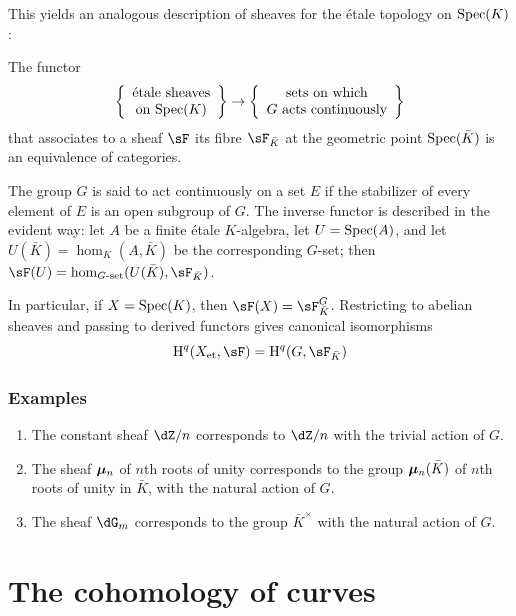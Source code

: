This yields an analogous description of sheaves for the étale topology on
$\operatorname{Spec}(K)$:

\begin{proposition}\label{I:2-4-4}
The functor
\[
  \left\{\begin{array}{c}
          \textnormal{étale sheaves} \\
          \textnormal{on $\operatorname{Spec}(K)$}
        \end{array}\right\}
  \to
  \left\{\begin{array}{c}
          \textnormal{sets on which} \\
          \textnormal{$G$ acts continuously}
        \end{array}\right\}
\]
that associates to a sheaf $\sF$ its fibre $\sF_{\bar K}$ at the
geometric point $\operatorname{Spec}(\bar K)$ is an equivalence of categories.
\end{proposition}

The group $G$ is said to act continuously on a set $E$ if the stabilizer
of every element of $E$ is an open subgroup of $G$. The inverse functor
is described in the evident way: let $A$ be a finite étale
$K$-algebra, let $U=\operatorname{Spec}(A)$, and let
$U(\bar K)=\hom_K(A,\bar K)$ be the corresponding $G$-set; then
$\sF(U)=\hom_{G\text{-set}}(U(\bar K),\sF_{\bar K})$.

In particular, if $X=\operatorname{Spec}(K)$, then $\sF(X)=\sF_{\bar K}^G$. Restricting
to abelian sheaves and passing to derived functors gives canonical
isomorphisms
\[
  \h^q(\et X,\sF) = \h^q(G,\sF_{\bar K})
\]

\subsubsection{Examples}\label{I:2-4-5}

\begin{enumerate}[\indent a)]
  \item The constant sheaf $\dZ/n$ corresponds to $\dZ/n$ with the
    trivial action of $G$.
  \item The sheaf ${\bm\mu}_n$ of $n$th roots of unity corresponds to the
    group ${\bm\mu}_n(\bar K)$ of $n$th roots of unity in $\bar K$, with
    the natural action of $G$.
  \item The sheaf $\dG_m$ corresponds to the group $\bar K^\times$ with
    the natural action of $G$.
\end{enumerate}

\section{The cohomology of curves}\label{I:3}


